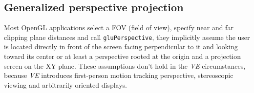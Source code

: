 \documentclass[acmtocl,acmnow]{acmtrans2m}
\begin{document}
% 
% 
% 


\subsection{Generalized perspective projection}\label{sec:generalizedperspectiveprojection}
Most OpenGL applications select a FOV (field of view), specify near and 
far clipping plane distances and call \verb=gluPerspective=, they implicitly
assume the user is located directly in front of the screen facing perpendicular
to it and looking toward its center or at least a 
perspective rooted at the origin and a projection screen on the XY plane. These
assumptions don't hold in the \emph{VE} circumstances, because \emph{VE}
introduces first-person motion tracking perspective, 
stereoscopic viewing and arbitrarily oriented displays.
\end{document}
